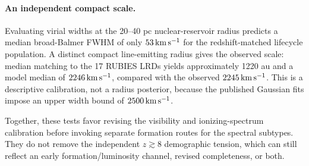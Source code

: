 \paragraph{An independent compact scale.}
Evaluating virial widths at the 20--40 pc nuclear-reservoir radius predicts a
median broad-Balmer FWHM of only $53\,{\rm km\,s^{-1}}$ for the redshift-matched
lifecycle population. A distinct compact line-emitting radius gives the
observed scale: median matching to the 17 RUBIES LRDs yields approximately
1220 au and a model median of $2246\,{\rm km\,s^{-1}}$, compared with the
observed $2245\,{\rm km\,s^{-1}}$. This is a descriptive calibration, not a
radius posterior, because the published Gaussian fits impose an upper width
bound of $2500\,{\rm km\,s^{-1}}$.

Together, these tests favor revising the visibility and ionizing-spectrum
calibration before invoking separate formation routes for the spectral
subtypes. They do not remove the independent $z\gtrsim8$ demographic tension,
which can still reflect an early formation/luminosity channel, revised
completeness, or both.

